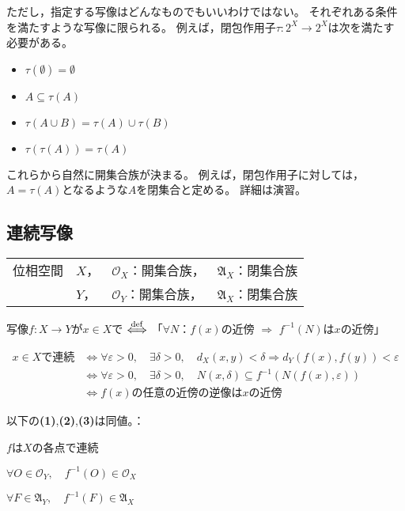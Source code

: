 \documentclass[uplatex]{jsarticle}
\begin{document}
ただし，指定する写像はどんなものでもいいわけではない。
それぞれある条件を満たすような写像に限られる。
例えば，閉包作用子$\tau \colon 2^{X} \longrightarrow 2^{X}$は次を満たす必要がある。
\begin{itemize}
  \vspace{-0.5\baselineskip}
  \item $\tau (\emptyset) = \emptyset$
  \item $A \subseteq \tau(A)$
  \item $\tau (A \cup B) = \tau (A) \cup \tau (B)$
  \item $\tau (\tau (A)) = \tau (A)$
  \vspace{-0.5\baselineskip}
\end{itemize}

これらから自然に開集合族が決まる。
例えば，閉包作用子に対しては，$A = \tau (A)$となるような$A$を閉集合と定める。
詳細は演習。

\subsection{連続写像}
\renewcommand{\arraystretch}{0.8}
\begin{tabular}{ll@{\,}l@{\,}l}
  位相空間 & $X$， & $\mathcal{O}_{X}$：開集合族， & $\mathfrak{A}_{X}$：閉集合族 \\
           & $Y$， & $\mathcal{O}_{Y}$：開集合族， & $\mathfrak{A}_{X}$：閉集合族
\end{tabular}
\renewcommand{\arraystretch}{1}

\begin{teigi}[連続性]
  写像$f \colon X \longrightarrow Y$が$x \in X$で $\overset{\mathrm{def}}{\Longleftrightarrow}$ 
  「$\forall N$：$f(x)$の近傍 $\Longrightarrow$ $f^{-1}(N)$は$x$の近傍」
\end{teigi}

\begin{align*}
  x \in X \text{で連続} & \Longleftrightarrow \forall \varepsilon > 0, \quad \exists \delta > 0, \quad d_{X} (x,y) < \delta \Longrightarrow d_{Y}(f(x), f(y)) < \varepsilon \\
  & \Longleftrightarrow \forall \varepsilon > 0, \quad \exists \delta > 0, \quad N(x,\delta) \subseteq f^{-1} (N(f(x), \varepsilon)) \\
  & \Longleftrightarrow f(x) \text{の任意の近傍の逆像は} x \text{の近傍}
\end{align*}

\begin{teiri}
  以下の{\bf (1)},{\bf (2)},{\bf (3)}は同値。：
  
   $f$は$X$の各点で連続

   $\forall O \in \mathcal{O}_{Y}, \quad f^{-1}(O) \in \mathcal{O}_{X}$

   $\forall F \in \mathfrak{A}_{Y}, \quad f^{-1}(F) \in \mathfrak{A}_{X}$
\end{teiri}
\end{document}
